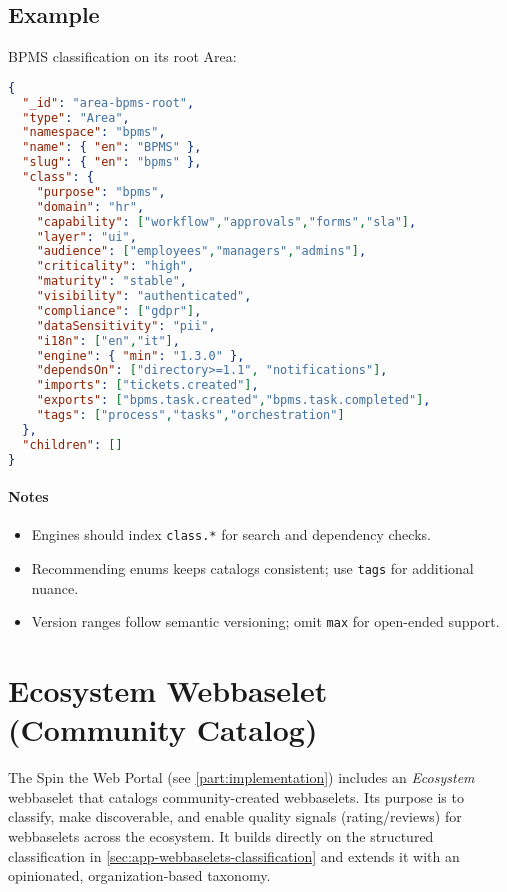 \subsection{Example}
BPMS classification on its root Area:
\begin{lstlisting}[language=JSON,caption={STWArea with classification}]
{
  "_id": "area-bpms-root",
  "type": "Area",
  "namespace": "bpms",
  "name": { "en": "BPMS" },
  "slug": { "en": "bpms" },
  "class": {
    "purpose": "bpms",
    "domain": "hr",
    "capability": ["workflow","approvals","forms","sla"],
    "layer": "ui",
    "audience": ["employees","managers","admins"],
    "criticality": "high",
    "maturity": "stable",
    "visibility": "authenticated",
    "compliance": ["gdpr"],
    "dataSensitivity": "pii",
    "i18n": ["en","it"],
    "engine": { "min": "1.3.0" },
    "dependsOn": ["directory>=1.1", "notifications"],
    "imports": ["tickets.created"],
    "exports": ["bpms.task.created","bpms.task.completed"],
    "tags": ["process","tasks","orchestration"]
  },
  "children": []
}
\end{lstlisting}

\paragraph{Notes}
\begin{itemize}
  \item Engines should index \texttt{class.*} for search and dependency checks.
  \item Recommending enums keeps catalogs consistent; use \texttt{tags} for additional nuance.
  \item Version ranges follow semantic versioning; omit \texttt{max} for open-ended support.
\end{itemize}

\section{Ecosystem Webbaselet (Community Catalog)}
\label{sec:app-ecosystem}

The Spin the Web Portal (see \cref{part:implementation}) includes an \emph{Ecosystem} webbaselet that catalogs community-created webbaselets. Its purpose is to classify, make discoverable, and enable quality signals (rating/reviews) for webbaselets across the ecosystem. It builds directly on the structured classification in \cref{sec:app-webbaselets-classification} and extends it with an opinionated, organization-based taxonomy.

